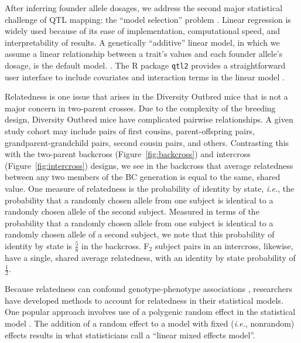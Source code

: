 \documentclass[]{article}\usepackage[]{graphicx}\usepackage[]{color}
\begin{document}

After inferring founder allele dosages, we address the second major statistical challenge of 
QTL mapping: the ``model selection'' problem \citep{broman2009guide}.
Linear regression is widely used because of its ease of implementation,
computational speed, and interpretability of results.
A genetically ``additive'' linear model, in which we assume a linear relationship between
a trait's values and each founder allele's dosage, is the default model.
\citep{gatti2014quantitative,broman2019rqtl2}.
The R package \texttt{qtl2} provides a straightforward user
interface to include covariates and interaction terms in the linear model \citep{broman2019rqtl2}.




Relatedness is one issue that arises in the Diversity Outbred mice that is not a major concern in 
two-parent crosses. Due to the complexity of the breeding design, Diversity Outbred mice
have 
complicated pairwise relationships. A given study cohort may include pairs of first
cousins, parent-offspring pairs, grandparent-grandchild pairs, second cousin pairs, and others.
Contrasting this with the two-parent backcross (Figure~\ref{fig:backcross}) and
intercross (Figure~\ref{fig:intercross}) designs, we see in the backcross that
average relatedness between any two members of the BC generation is equal to the same, shared value.
One measure of relatedness is the probability of identity by state, \emph{i.e.}, the
probability that a randomly chosen allele from one subject is identical to a randomly chosen
allele of the second subject. Measured in terms of the probability that a randomly chosen allele
from one subject is identical to a randomly chosen allele of a second subject, we note that
this probability of identity by state is $\frac{5}{8}$ in the backcross. F$_2$ subject pairs in an intercross, likewise, have a single, shared average relatedness, with an identity by state probability of $\frac{1}{2}$.

Because relatedness can confound genotype-phenotype associations \citep{yang2014advantages}, researchers have developed methods to account for relatedness in their statistical models. One popular approach involves use of a polygenic random effect in the statistical model \citep{kang2008efficient}. The addition of a random effect to a model with fixed (\emph{i.e.}, nonrandom) effects results in what statisticians call a ``linear mixed effects model''. 







\printbibliography
\end{document}
